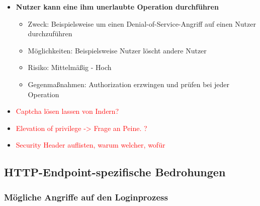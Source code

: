 \documentclass[12pt,DIV14,BCOR10mm,a4paper,parskip=half-,headsepline,headinclude,english,ngerman,bibliography=totocnumbered]{scrreprt}
\begin{document}
\begin{itemize}
  \item \textbf{Nutzer kann eine ihm unerlaubte Operation durchführen}
  \begin{itemize}
  \item Zweck: Beispielsweise um einen Denial-of-Service-Angriff auf einen Nutzer durchzuführen
  \item Möglichkeiten: Beispielsweise Nutzer löscht andere Nutzer
  \item Risiko: Mittelmäßig - Hoch
  \item Gegenmaßnahmen: Authorization erzwingen und prüfen bei jeder Operation
  \end{itemize}

  \item \textcolor{red}{Captcha lösen lassen von Indern?}
  \item \textcolor{red}{Elevation of privilege -> Frage an Peine. ?}
  \item \textcolor{red}{Security Header auflisten, warum welcher, wofür}
\end{itemize}

\subsection{HTTP-Endpoint-spezifische Bedrohungen}

\subsubsection{Mögliche Angriffe auf den Loginprozess}
\end{document}
